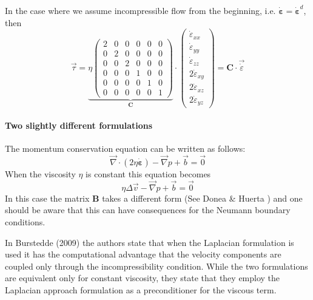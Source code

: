 In the case where we assume incompressible flow from the beginning, 
i.e. $\dot{\bm \varepsilon}=\dot{\bm \varepsilon}^d$, 
then 
\begin{equation}
\vec \tau  
=
\underbrace{
\eta
\left(
\begin{array}{cccccc}
2 & 0& 0& 0& 0& 0\\
0 & 2& 0& 0& 0& 0\\
0 & 0& 2& 0& 0& 0\\
0 &0 &0 & 1& 0& 0\\
0 &0 &0 & 0& 1& 0\\
0 &0 &0 & 0& 0& 1 
\end{array}
\right)
}_{\bm C}
\cdot
\left(
\begin{array}{c}
\dot\varepsilon_{xx} \\
\dot\varepsilon_{yy} \\
\dot\varepsilon_{zz} \\
2\dot\varepsilon_{xy} \\
2\dot\varepsilon_{xz} \\
2\dot\varepsilon_{yz} 
\end{array}
\right)
=
{\bm C} \cdot \vec{\dot \varepsilon}
\end{equation}

\paragraph{Two slightly different formulations}

The momentum conservation equation can be written as follows:
\[
\vec\nabla\cdot( 2 \eta \dot{\bm \varepsilon}) - \vec\nabla p + \vec b = \vec 0
\]
When the viscosity $\eta$ is constant this equation becomes
\[
\eta \Delta \vec v - \vec\nabla p + \vec b = \vec 0
\]
In this case the matrix ${\bm B}$ takes a different form (See Donea \& Huerta \cite[Eq. 6.24]{dohu03})
and one should be aware that this can have consequences for the Neumann boundary conditions. 

In Burstedde \etal (2009) \cite{bugs09} the authors state that when the Laplacian formulation is used 
it has the computational advantage that the velocity
components are coupled only through the incompressibility condition. 
While the two formulations are equivalent only for constant viscosity, they state 
that they employ the Laplacian approach formulation as a preconditioner for the viscous term. 

